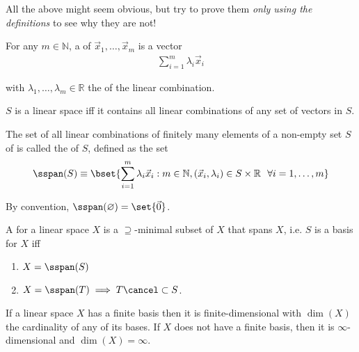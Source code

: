 \documentclass{article}
\begin{document}
All the above might seem obvious, but try to prove them \textit{only using the definitions} to see why they are not!
\begin{definition}
  For any $m \in \mathbb{N}$, a  of $\vec{x}_1, \ldots, \vec{x}_m$ is a vector
  \begin{align*}
    \sum^{m}_{i = 1} \lambda_i \vec{x}_i
  \end{align*}

  with $\lambda_1, \ldots, \lambda_m \in \mathbb{R}$ the  of the linear combination.
\end{definition}

\begin{theorem}
  $S$ is a linear space iff it contains all linear combinations of any set of vectors in $S$.
\end{theorem}

\begin{definition}
    The set of all linear combinations of finitely many elements of a non-empty set $S$ of is called the  of $S$, defined as the set
  \begin{align*}
    \sspan(S)
    \equiv
    \bset{
      \sum^{m}_{i = 1}  \lambda_i \vec{x}_i:
      m \in \mathbb{N}, (\vec{x}_i, \lambda_i) \in S \times \mathbb{R} ~~ \forall i = 1, \ldots, m
    }
  \end{align*}

  By convention, $\sspan(\varnothing) = \set{\vec{0}}$.
\end{definition}

\begin{definition}
  A  for a linear space $X$ is a $\supseteq$-minimal subset of $X$ that spans $X$, i.e. $S$ is a basis for $X$ iff
  \begin{enumerate}
    \item $X = \sspan(S)$

    \item $X = \sspan(T) \implies T \cancel\subset S$.
  \end{enumerate}
\end{definition}

\begin{definition}
  If a linear space $X$ has a finite basis then it is finite-dimensional with  $\dim(X)$ the cardinality of any of its bases. If $X$ does not have a finite basis, then it is $\infty$-dimensional and $\dim(X) = \infty$.
\end{definition}
\end{document}
